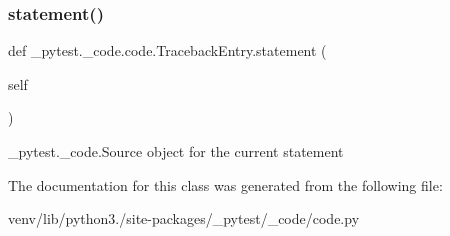 \subsubsection{\texorpdfstring{statement()}{statement()}}
{\footnotesize\ttfamily def \+\_\+pytest.\+\_\+code.\+code.\+Traceback\+Entry.\+statement (\begin{DoxyParamCaption}\item[{}]{self }\end{DoxyParamCaption})}

\begin{DoxyVerb}_pytest._code.Source object for the current statement \end{DoxyVerb}
 

The documentation for this class was generated from the following file\+:\begin{DoxyCompactItemize}
\item 
venv/lib/python3./site-\/packages/\+\_\+pytest/\+\_\+code/code.\+py\end{DoxyCompactItemize}
